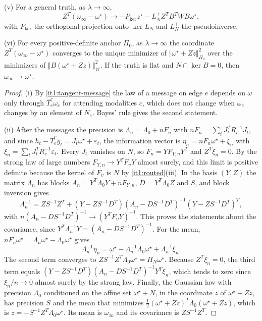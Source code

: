 \textup{(v)} For a general truth, as $\lambda\to\infty$,
\begin{equation}
Z^T(\omega_\infty-\omega^\star)\longrightarrow-P_{\ker}z^\star-L_N^+Z^TB^TWB\omega^\star,
\label{it1:bias}
\end{equation}
with $P_{\ker}$ the orthogonal projection onto $\ker L_N$ and $L_N^+$ the pseudoinverse.

\textup{(vi)} For every positive-definite anchor $\Pi_0$, as $\lambda\to\infty$ the coordinate $Z^T(\omega_\infty-\omega^\star)$ converges to the unique minimizer of $\Vert\omega^\star+Zz\Vert_{\Pi_0}^2$ over the minimizers of $\Vert B(\omega^\star+Zz)\Vert_W^2$. If the truth is flat and $N\cap\ker B=0$, then $\omega_\infty\to\omega^\star$.
\begin{proof}
(i) By \cref{it1:tangent-message} the law of a message on edge $e$ depends on $\omega$ only through $\bar T_e^c\omega_e$ for attending modalities $c$, which does not change when $\omega_e$ changes by an element of $N_e$. Bayes' rule gives the second statement.

(ii) After the messages the precision is $\Lambda_n=\Lambda_0+nF_n$ with $nF_n=\sum_tJ_t^TR_c^{-1}J_t$, and since $h_t-\bar T_e^c\bar y_t=J_t\omega^\star+\varepsilon_t$, the information vector is $\eta_n=nF_n\omega^\star+\xi_n$ with $\xi_n=\sum_tJ_t^TR_c^{-1}\varepsilon_t$. Every $J_t$ vanishes on $N$, so $F_n=YF_{Y,n}Y^T$ and $Z^T\xi_n=0$. By the strong law of large numbers $F_{Y,n}\to Y^TF_\upsilon Y$ almost surely, and this limit is positive definite because the kernel of $F_\upsilon$ is $N$ by \cref{it1:routed}(iii). In the basis $(Y,Z)$ the matrix $\Lambda_n$ has blocks $A_n=Y^T\Lambda_0Y+nF_{Y,n}$, $D=Y^T\Lambda_0Z$ and $S$, and block inversion gives
\begin{equation}
\Lambda_n^{-1}=ZS^{-1}Z^T+(Y-ZS^{-1}D^T)(A_n-DS^{-1}D^T)^{-1}(Y-ZS^{-1}D^T)^T,
\end{equation}
with $n(A_n-DS^{-1}D^T)^{-1}\to(Y^TF_\upsilon Y)^{-1}$. This proves the statements about the covariance, since $Y^T\Lambda_n^{-1}Y=(A_n-DS^{-1}D^T)^{-1}$. For the mean, $nF_n\omega^\star=\Lambda_n\omega^\star-\Lambda_0\omega^\star$ gives
\begin{equation}
\Lambda_n^{-1}\eta_n=\omega^\star-\Lambda_n^{-1}\Lambda_0\omega^\star+\Lambda_n^{-1}\xi_n.
\end{equation}
The second term converges to $ZS^{-1}Z^T\Lambda_0\omega^\star=\Pi_N\omega^\star$. Because $Z^T\xi_n=0$, the third term equals $(Y-ZS^{-1}D^T)(A_n-DS^{-1}D^T)^{-1}Y^T\xi_n$, which tends to zero since $\xi_n/n\to0$ almost surely by the strong law. Finally, the Gaussian law with precision $\Lambda_0$ conditioned on the affine set $\omega^\star+N$, in the coordinate $z$ of $\omega^\star+Zz$, has precision $S$ and the mean that minimizes $\frac12(\omega^\star+Zz)^T\Lambda_0(\omega^\star+Zz)$, which is $z=-S^{-1}Z^T\Lambda_0\omega^\star$. Its mean is $\omega_\infty$ and its covariance is $ZS^{-1}Z^T$.


\end{proof}
